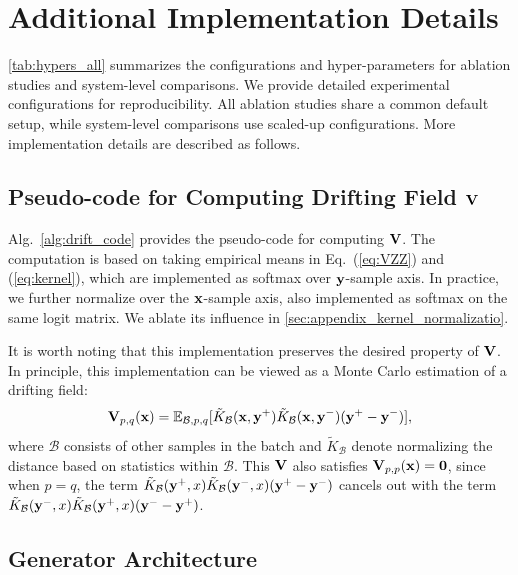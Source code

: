 \clearpage
\newpage
\appendix
\section{Additional Implementation Details}
\label{sec:appendix_impl}

\cref{tab:hypers_all} summarizes the configurations and hyper-parameters for ablation studies and system-level comparisons. 
We provide detailed experimental configurations for reproducibility. All ablation studies share a common default setup, while system-level comparisons use scaled-up configurations. More implementation details are described as follows.



\subsection{Pseudo-code for Computing Drifting Field $\mathbf{V}$}
\label{sec:appendix_compute_V}

Alg.~\ref{alg:drift_code} provides the pseudo-code for computing $\mathbf{V}$. The computation is based on taking empirical means in Eq.~(\ref{eq:VZZ}) and (\ref{eq:kernel}), which are implemented as softmax over $\mathbf{y}$-sample axis. In practice, we further normalize over the $\mathbf{x}$-sample axis, also implemented as softmax on the same logit matrix. 
We ablate its influence in \ref{sec:appendix_kernel_normalizatio}.

\renewcommand{\yn}{\y^{-}}
\renewcommand{\yp}{\y^{+}}
\newcommand{\B}{\mathcal{B}}

It is worth noting that this implementation preserves the desired property of $\mathbf{V}$.
In principle, this implementation can be viewed as a Monte Carlo estimation of a drifting field:
\begin{equation}
\V_{p,q}(\x)=\mathbb E_{\B,p,q}[\tilde K_\B(\x, \yp)\tilde K_\B(\x, \yn)(\yp-\yn)],    
\end{equation}
where $\B$ consists of other samples in the batch and $\tilde K_\B$ denote normalizing the distance based on statistics within $\B$. This $\mathbf{V}$ also satisfies $\mathbf{V}_{p,p}(\mathbf{x})=\mathbf 0$, since when $p=q$, the term  $\tilde K_\B(\yp, x)\tilde K_\B(\yn,x)(\yp-\yn)$ cancels out with the term $\tilde K_\B(\yn, x)\tilde K_\B(\yp,x)(\yn-\yp)$. 



\subsection{Generator Architecture}
\label{sec:appendix_generator}

